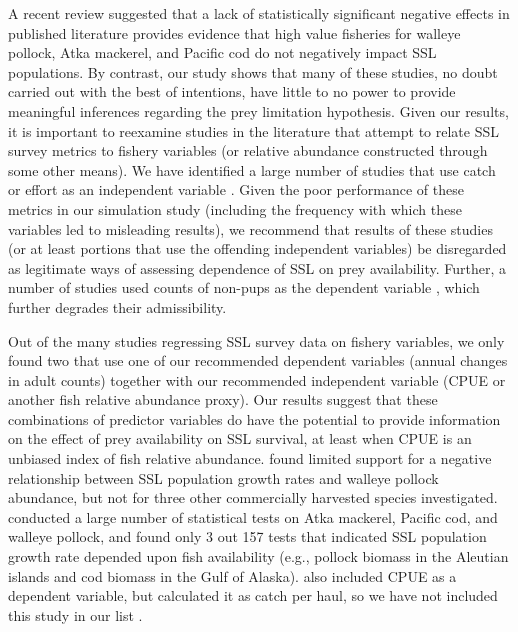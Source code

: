 \documentclass[11pt]{article}
\begin{document}
A recent review \citep{Bernard:2011dq} suggested that a lack of statistically significant negative effects in published literature provides evidence that high value fisheries for walleye pollock, Atka mackerel, and Pacific cod do not negatively impact SSL populations.  By contrast, our study shows that many of these studies, no doubt carried out with the best of intentions, have little to no power to provide meaningful inferences regarding the prey limitation hypothesis.
Given our results, it is important to reexamine studies in the literature that attempt to relate SSL survey metrics to fishery variables (or relative abundance constructed through some other means).  We have identified a large number of studies that use catch or effort as an independent variable \citep{Loughlin:1989kl,Ferrero:1994hc,Sampson:1995cr,Soboleff:2006fk,Dillingham:2006fv,Calkins:2008ve,Trites:2010ly,afsc:2010dz,Hui:2011uq}.
Given the poor performance of these metrics in our simulation study (including the frequency with which these
variables led to misleading results), we recommend that results of these studies (or at least portions that use the offending independent variables) be disregarded as legitimate ways of assessing dependence of SSL on prey availability.  Further, a number of studies used counts of non-pups as the dependent variable \citep[all the aforementioned studies except][]{Dillingham:2006fv,afsc:2010dz}, which further degrades their admissibility.

Out of the many studies regressing SSL survey data on fishery variables, we only found two that use one of our recommended dependent variables (annual changes in adult counts) together with our recommended independent variable (CPUE or another fish relative abundance proxy).  Our results suggest that these combinations of predictor variables do have the potential to provide information on the effect of prey availability on SSL survival, at least when CPUE is an unbiased index of fish relative abundance.  \citet{Dillingham:2006fv} found limited support for a negative relationship between SSL population growth rates and walleye pollock abundance, but not for three other commercially harvested species investigated.  \citet{Hui:2011uq} conducted a large number of statistical tests on Atka mackerel, Pacific cod, and walleye pollock, and found only 3 out 157 tests that indicated SSL population growth rate depended upon fish availability (e.g., pollock biomass in the Aleutian islands and cod biomass in the Gulf of Alaska).  \citet{Trites:2010ly} also included CPUE as a dependent variable, but calculated it as catch per haul, so we have not included this study in our list \citep[we would argue that this construction has potentialy for extreme hyperstability relative to actual fish abundance; see e.g.,][]{Hilborn1992}.
\end{document}

